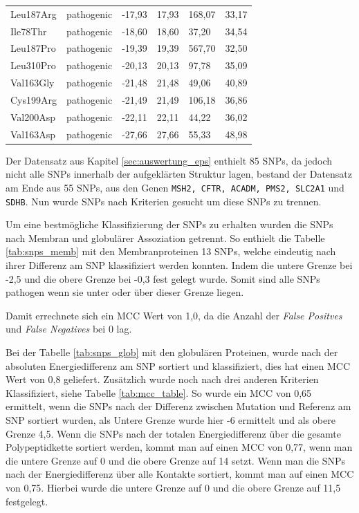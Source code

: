 \begin{table}[]
{\begin{tabular}{llllll}
        \rowcolor[HTML]{FFCCC9} 
        Leu187Arg & pathogenic & -17,93 & 17,93 & 168,07 & 33,17 \\
        \rowcolor[HTML]{FFCCC9} 
        Ile78Thr & pathogenic & -18,60 & 18,60 & 37,20 & 34,54 \\
        \rowcolor[HTML]{FFCCC9} 
        Leu187Pro & pathogenic & -19,39 & 19,39 & 567,70 & 32,50 \\
        \rowcolor[HTML]{FFCCC9} 
        Leu310Pro & pathogenic & -20,13 & 20,13 & 97,78 & 35,09 \\
        \rowcolor[HTML]{FFCCC9} 
        Val163Gly & pathogenic & -21,48 & 21,48 & 49,06 & 40,89 \\
        \rowcolor[HTML]{FFCCC9} 
        Cys199Arg & pathogenic & -21,49 & 21,49 & 106,18 & 36,86 \\
        \rowcolor[HTML]{FFCCC9} 
        Val200Asp & pathogenic & -22,11 & 22,11 & 44,22 & 36,02 \\
        \rowcolor[HTML]{FFCCC9} 
        Val163Asp & pathogenic & -27,66 & 27,66 & 55,33 & 48,98
    \end{tabular}}
\end{table}

Der Datensatz aus Kapitel \ref{sec:auswertung_eps} enthielt 85 \ac{SNP}s, da jedoch nicht alle SNPs innerhalb der aufgeklärten Struktur lagen, bestand der Datensatz am Ende aus 55 \ac{SNP}s, aus den Genen \texttt{MSH2, CFTR, ACADM, PMS2, SLC2A1} und \texttt{SDHB}. Nun wurde \ac{SNP}s nach Kriterien gesucht um diese SNPs zu trennen. 

Um eine bestmögliche Klassifizierung der \ac{SNP}s zu erhalten wurden die \ac{SNP}s nach Membran und globulärer Assoziation getrennt. So enthielt die Tabelle \ref{tab:snps_memb} mit den Membranproteinen 13 \ac{SNP}s, welche eindeutig nach ihrer Differenz am \ac{SNP} klassifiziert werden konnten. Indem die untere Grenze bei -2,5 und die obere Grenze bei -0,3 fest gelegt wurde. Somit sind alle \ac{SNP}s pathogen wenn sie unter oder über dieser Grenze liegen.

Damit errechnete sich ein MCC Wert von 1,0, da die Anzahl der \emph{False Positves} und \emph{False Negatives} bei 0 lag.

Bei der Tabelle \ref{tab:snps_glob} mit den globulären Proteinen, wurde nach der absoluten Energiedifferenz am \ac{SNP} sortiert und klassifiziert, dies hat einen MCC Wert von 0,8 geliefert. Zusätzlich wurde noch nach drei anderen Kriterien Klassifiziert, siehe Tabelle \ref{tab:mcc_table}. So wurde ein MCC von 0,65 ermittelt, wenn die \ac{SNP}s nach der Differenz zwischen Mutation und Referenz am \ac{SNP} sortiert wurden, als Untere Grenze wurde hier -6 ermittelt und als obere Grenze 4,5. Wenn die \ac{SNP}s nach der totalen Energiedifferenz über die gesamte Polypeptidkette sortiert werden, kommt man auf einen MCC von 0,77, wenn man die untere Grenze auf 0 und die obere Grenze auf 14 setzt. Wenn man die \ac{SNP}s nach der Energiedifferenz über alle Kontakte sortiert, kommt man auf einen MCC von 0,75. Hierbei wurde die untere Grenze auf 0 und die obere Grenze auf 11,5 festgelegt.

